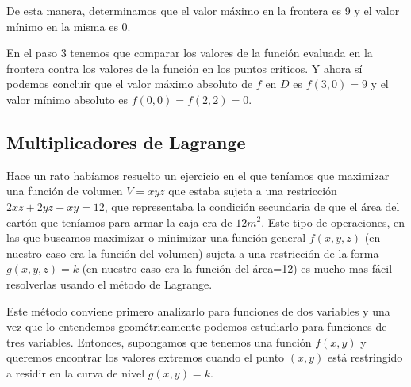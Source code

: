 \documentclass[12pt]{article}
\begin{document}
De esta manera, determinamos que el valor máximo en la frontera es 9 y el valor mínimo en la misma es 0.

En el paso 3 tenemos que comparar los valores de la función evaluada en la frontera contra los valores de la función en los puntos críticos. Y ahora sí podemos concluir que el valor máximo absoluto de $ f $ en $ D $ es $ f(3,0)=9 $ y el valor mínimo absoluto es $ f(0,0)=f(2,2)=0 $.

\begin{center}
\end{center}

\subsection{Multiplicadores de Lagrange}
Hace un rato habíamos resuelto un ejercicio en el que teníamos que maximizar una función de volumen $ V = xyz $ que estaba sujeta a una restricción $ 2xz + 2yz + xy = 12 $, que representaba la condición secundaria de que el área del cartón que teníamos para armar la caja era de $ 12m^2 $. Este tipo de operaciones, en las que buscamos maximizar o minimizar una función general $ f(x,y,z) $ (en nuestro caso era la función del volumen) sujeta a una restricción de la forma $ g(x,y,z)=k $ (en nuestro caso era la función del área=12) es mucho mas fácil resolverlas usando el método de Lagrange.

Este método conviene primero analizarlo para funciones de dos variables y una vez que lo entendemos geométricamente podemos estudiarlo para funciones de tres variables. Entonces, supongamos que tenemos una función $ f(x,y) $ y queremos encontrar los valores extremos cuando el punto $ (x,y) $ está restringido a residir en la curva de nivel $ g(x,y)=k $. 
\end{document}
